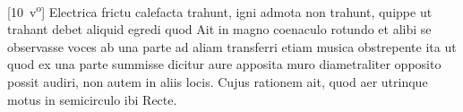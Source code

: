 [10~v\textsuperscript{o}]
\pend
\pstart%
Electrica frictu\protect{} calefacta trahunt, igni admota non trahunt, quippe ut trahant debet aliquid egredi
quod 
Ait in magno coenaculo\protect{} rotundo et alibi se observasse voces ab una parte ad aliam transferri etiam musica\protect{} obstrepente ita ut quod ex una parte summisse dicitur aure\protect{} apposita muro diametraliter opposito possit audiri, non autem in aliis locis. Cujus rationem ait, quod aer\protect{} utrinque motus in semicirculo ibi 
Recte.
\pend
\count{}
\count{}
\count{}